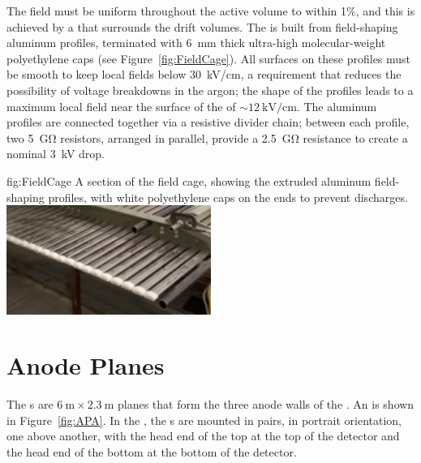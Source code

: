 The field must be uniform throughout the active  volume to within 1\%, and this is achieved by a  that surrounds the drift volumes. The  is built from field-shaping aluminum profiles, terminated with \SI{6}{\mm} thick ultra-high molecular-weight polyethylene caps (see Figure~\ref{fig:FieldCage}). All surfaces on these profiles must be smooth to keep local fields below \SI{30}{\kilo\volt/\cm}, a requirement that reduces the possibility of voltage breakdowns in the argon; the shape of the profiles leads to a maximum local field near the surface of the  of $\sim\!\SI{12}{\kilo\volt/\cm}$. The aluminum profiles are connected together via a resistive divider chain; between each profile, two \SI{5}{\giga\ohm} resistors, arranged in parallel, provide a \SI{2.5}{\giga\ohm} resistance to create a nominal \SI{3}{\kilo\volt} drop.

\begin{dunefigure}{fig:FieldCage}
{A section of the field cage, showing the extruded aluminum field-shaping profiles, with white polyethylene caps on the ends to prevent discharges.}
\includegraphics[width=0.5\textwidth]{graphics/FieldCage.pdf}
\end{dunefigure}

\section{Anode Planes}
\label{sec:fdsp-exec-apas}

The s are $\SI{6}{\meter}\times\SI{2.3}{\meter}$ planes that form the three anode walls of the . An  is shown in Figure~\ref{fig:APA}. In the , the s are mounted in pairs, in portrait orientation, one above another, with the head end of the top  at the top of the detector and the head end of the bottom  at the bottom of the detector.

